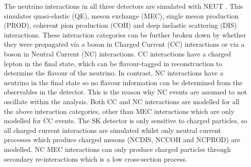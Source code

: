 The neutrino interactions in all three detectors are simulated with NEUT \cite{Hayato2021, neut}. This simulates quasi-elastic (QE), meson exchange (MEC), single meson production (PROD), coherent pion production (COH) and deep inelastic scattering (DIS) interactions. These interaction categories can be further broken down by whether they were propagated via a  boson in Charged Current (CC) interactions or via a  boson in Neutral Current (NC) interactions. CC interactions have a charged lepton in the final state, which can be flavour-tagged in reconstruction to determine the flavour of the neutrino. In contrast, NC interactions have a neutrino in the final state so no flavour information can be determined from the observables in the detector. This is the reason why NC events are assumed to not oscillate within the analysis. Both CC and NC interactions are modelled for all the above interaction categories, other than MEC interactions which are only modelled for CC events. The SK detector is only sensitive to charged particles, so all charged current interactions are simulated whilst only neutral current processes which produce charged mesons (NCDIS, NCCOH and NCPROD) are modelled. NC MEC interactions can only produce charged particles through secondary re-interactions which is a low cross-section process.

